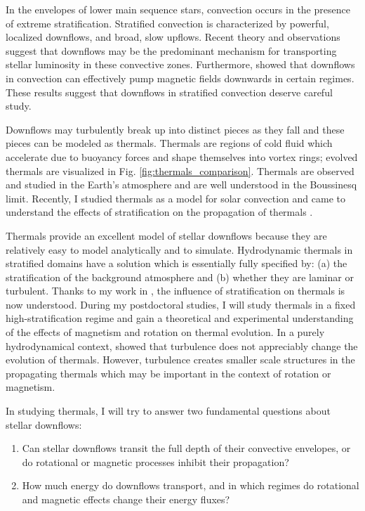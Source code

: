 \documentclass[11pt, preprint]{aastex}
\begin{document}
In the envelopes of lower main sequence stars, convection occurs in the presence of extreme stratification.
Stratified convection is characterized by powerful, localized downflows, and broad, slow upflows.
Recent theory and observations \citep[e.g.,][]{hanasoge&all2015, brandenburg2016, kapyla&all2017, andersLB2019} suggest that downflows may be the predominant mechanism for transporting stellar luminosity in these convective zones.
Furthermore, \citet{tobias&all1998} showed that downflows in convection can effectively pump magnetic fields downwards in certain regimes.
These results suggest that downflows in stratified convection deserve careful study.

Downflows may turbulently break up into distinct pieces as they fall and these pieces can be modeled as thermals.
Thermals are regions of cold fluid which accelerate due to buoyancy forces and shape themselves into vortex rings; evolved thermals are visualized in Fig. \ref{fig:thermals_comparison}.
Thermals are observed and studied in the Earth's atmosphere and are well understood in the Boussinesq limit.
Recently, I studied thermals as a model for solar convection and came to understand the effects of stratification on the propagation of thermals \citep{andersLB2019}.

Thermals provide an excellent model of stellar downflows because they are relatively easy to model analytically and to simulate.
Hydrodynamic thermals in stratified domains have a solution which is essentially fully specified by: (a) the stratification of the background atmosphere and (b) whether they are laminar or turbulent.
Thanks to my work in \citet{andersLB2019}, the influence of stratification on thermals is now understood.
During my postdoctoral studies, I will study thermals in a fixed high-stratification regime and gain a theoretical and experimental understanding of the effects of magnetism and rotation on thermal evolution.
In a purely hydrodynamical context, \citet{lecoanet&jeevanjee2019} showed that turbulence does not appreciably change the evolution of thermals.
However, turbulence creates smaller scale structures in the propagating thermals which may be important in the context of rotation or magnetism.

In studying thermals, I will try to answer two fundamental questions about stellar downflows:
\begin{enumerate}
\vspace{-10pt}
\item Can stellar downflows transit the full depth of their convective envelopes, or do rotational or magnetic processes inhibit their propagation?
\vspace{-10pt}
\item How much energy do downflows transport, and in which regimes do rotational and magnetic effects change their energy fluxes?
\vspace{-10pt}
\end{enumerate}
\end{document}
